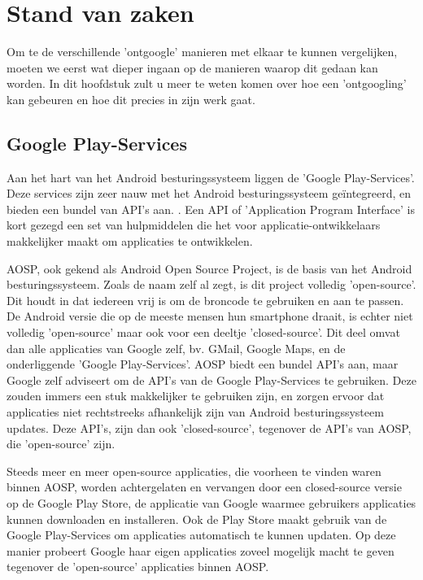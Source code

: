 \chapter{Stand van zaken}
\label{ch:stand-van-zaken}



Om te de verschillende 'ontgoogle' manieren met elkaar te kunnen vergelijken, moeten we eerst wat dieper ingaan op de manieren waarop dit gedaan kan worden. In dit hoofdstuk zult u meer te weten komen over hoe een 'ontgoogling' kan gebeuren en hoe dit precies in zijn werk gaat.

\section{Google Play-Services}
Aan het hart van het Android besturingssysteem liggen de 'Google Play-Services'. Deze services zijn zeer nauw met het Android besturingssysteem geïntegreerd, en bieden een bundel van API's aan. \autocite{marshall_google-play-services}. Een API of 'Application Program Interface' is kort gezegd een set van hulpmiddelen die het voor applicatie-ontwikkelaars makkelijker maakt om applicaties te ontwikkelen. \autocite{beal_api}

AOSP, ook gekend als Android Open Source Project, is de basis van het Android besturingssysteem. Zoals de naam zelf al zegt, is dit project volledig 'open-source'. Dit houdt in dat iedereen vrij is om de broncode te gebruiken en aan te passen. De Android versie die op de meeste mensen hun smartphone draait, is echter niet volledig 'open-source' maar ook voor een deeltje 'closed-source'. Dit deel omvat dan alle applicaties van Google zelf, bv. GMail, Google Maps, en de onderliggende 'Google Play-Services'. \autocite{amadeo_open-source} AOSP biedt een bundel API's  aan, maar Google zelf adviseert om de API's van de Google Play-Services te gebruiken. Deze zouden immers een stuk makkelijker te gebruiken zijn, en zorgen ervoor dat applicaties niet rechtstreeks afhankelijk zijn van Android besturingssysteem updates. \autocite{marshall_google-play-services} Deze API's, zijn dan ook 'closed-source', tegenover de API's van AOSP, die 'open-source' zijn.  

Steeds meer en meer open-source applicaties, die voorheen te vinden waren binnen AOSP, worden achtergelaten en vervangen door een closed-source versie op de Google Play Store, de applicatie van Google waarmee gebruikers applicaties kunnen downloaden en installeren. Ook de Play Store maakt gebruik van de Google Play-Services om applicaties automatisch te kunnen updaten. Op deze manier probeert Google haar eigen applicaties zoveel mogelijk macht te geven tegenover de 'open-source' applicaties binnen AOSP. \autocite{amadeo_open-source}

